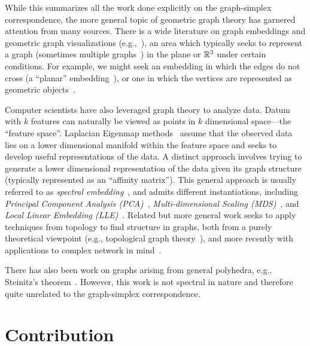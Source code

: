 While this summarizes all  the work done explicitly on the  graph-simplex correspondence, the  more general topic of geometric graph theory has  garnered attention from many sources.  
There is a wide literature on graph embeddings and geometric graph visualizations (e.g.,~\cite{tamassia2013handbook,brass2007simultaneous,kamada1989algorithm,fruchterman1991graph,de1990draw}), an area  which typically seeks to represent a  graph (sometimes multiple graphs~\cite{erten2005simultaneous,evans2016simultaneous,blasius2012simultaneous}) in the plane or $\mathbb{R}^3$ under  certain  conditions. For example, we might seek  an embedding in which the edges do not cross (a ``planar'' embedding~\cite{kant1993algorithms,nishizeki2004planar}), or one in which the vertices are represented as geometric objects~\cite{dean1997rectangle}. 


Computer scientists have  also leveraged graph theory to analyze data. Datum with $k$  features can naturally be viewed  as points in $k$ dimensional space---the ``feature space''.  
Laplacian Eigenmap methods~\cite{belkin2002laplacian} assume that the observed data lies on a lower dimensional  manifold within the  feature space and seeks to develop useful representations of the data.  
A distinct approach involves trying to generate a lower dimensional representation of the  data given its graph structure  (typically represented as an ``affinity matrix''). This general approach is usually referred to as \emph{spectral embedding}~\cite{brand2003unifying,bengio2004learning}, and admits different instantiations,  
including \emph{Principal Component Analysis (PCA)}~\cite{jolliffe2011principal}, 
\emph{Multi-dimensional Scaling (MDS)}~\cite{kruskal1978multidimensional,cox2000multidimensional}, and 
\emph{Local  Linear Embedding (LLE)}~\cite{roweis2000nonlinear}. 
Related but more general work seeks  to apply techniques from topology to  find structure in graphs, both from a purely theoretical viewpoint  (e.g., topological  graph theory~\cite{gross2001topological}),  and more recently with applications to complex network in mind~\cite{salnikov2018simplicial,wu2015emergent}. 

There has also been work on graphs arising from general polyhedra, e.g., Steinitz's theorem~\cite{steinitz1922polyeder}. However, this work is not spectral in nature and therefore quite unrelated to the graph-simplex  correspondence. 

\section{Contribution}
\label{chap:intro_contribution}

